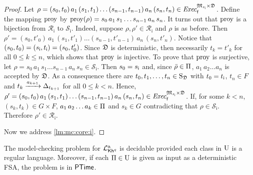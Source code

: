 \begin{proof}
  Let
  $\rho=(s_0,t_0)\, a_1\, (s_1,t_1)\ldots (s_{n-1},t_{n-1})\, a_n\, (s_n,t_n) \in\mathit{Exec}_{\mathsf{f}}^{{\mathfrak{M}}_{{s_{\textsf{i}}}}{\times}{\mathfrak{D}}}$.
  Define the mapping $\mathrm{proy}$ by
  $\mathrm{proy}(\rho)=s_0\, a_1\, s_1\ldots s_{n-1}\, a_n\, s_n$.
  It turns out that $\mathrm{proy}$ is a bijection from
  $\mathcal{R}_{\mathsf{i}}$ to $\mathcal{S}_{\mathsf{i}}$.
  Indeed, suppose $\rho,\rho'\in\mathcal{R}_{\textsf{i}}$ and $\rho$
  is as before. Then
  $\rho'=(s_0,t'_0)\, a_1\, (s_1,t'_1)\ldots (s_{n-1},t'_{n-1})\, a_n\, (s_n,t'_n)$.
  Notice that $(s_0,t_0)=({s_{\textsf{i}}},{t_{\textsf{i}}})=(s_0,t'_0)$.  Since ${\mathfrak{D}}$ is
  deterministic, then necessarily $t_k=t'_k$ for all $0\leq k\leq n$,
  which shows that $\mathrm{proy}$ is injective.
  To prove that $\mathrm{proy}$ is surjective, let
  $\rho=s_0\, a_1\, s_1\ldots s_{n-1}\, a_n\, s_n\in\mathcal{S}_{\textsf{i}}$.
  Then $s_0={s_{\textsf{i}}}$ and, since $\bar{\rho}\in\Pi$,
  $a_1\, a_2\ldots a_n$ is accepted by ${\mathfrak{D}}$.
  As a consequence there are $t_0,t_1,\ldots,t_n\in\operatorname{S}_{\mathfrak{D}}$ with
  $t_0={t_{\textsf{i}}}$, $t_n\in F$ and $t_k\xrightarrow{a_{k+1}}\Delta_{t_{k+1}}$ for
  all $0\leq k<n$.
  Hence,
  $\rho'=(s_0,t_0)\, a_1\, (s_1,t_1)\ldots (s_{n-1},t_{n-1})\, a_n\, (s_n,t_n)\in\mathit{Exec}_{\mathsf{f}}^{{\mathfrak{M}}_{{s_{\textsf{i}}}}{\times}{\mathfrak{D}}}$.
  If, for some $k<n$, $(s_k,t_k)\in{G{\times}F}$,
  $a_1\, a_2\ldots a_k\in\Pi$ and $s_k\in G$ contradicting that
  $\rho\in\mathcal{S}_{\mathsf{i}}$.
  Therefore $\rho'\in\mathcal{R}_{\mathsf{i}}$.

  Now we address \cref{lm:mc:core:i}.


  
  
\end{proof}





\begin{theorem}\label{th:PKhadapt:mc}
  The model-checking problem for ${\mathcal{L}^{\mathrm{a}}_{{\mathsf{Kh}}^q}}$ is decidable provided
  each class in $\operatorname{U}$ is a regular language. Moreover, if each
  $\Pi\in\operatorname{U}$ is given as input as a deterministic FSA, the
  problem is in ${\rm\textsf{PTime}}$.
\end{theorem}





